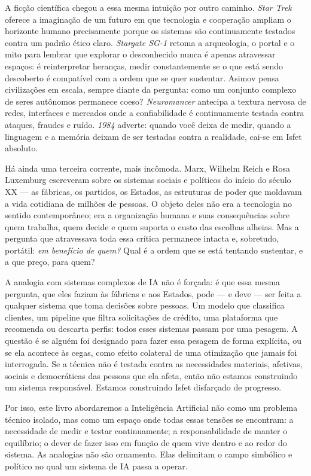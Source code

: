A ficção científica chegou a essa mesma intuição por outro caminho.
\textit{Star Trek} oferece a imaginação de um futuro em que tecnologia e
cooperação ampliam o horizonte humano precisamente porque os sistemas
são continuamente testados contra um padrão ético claro. \textit{Stargate
SG-1} retoma a arqueologia, o portal e o mito para lembrar que explorar
o desconhecido nunca é apenas atravessar espaços: é reinterpretar
heranças, medir constantemente se o que está sendo descoberto é
compatível com a ordem que se quer sustentar. Asimov pensa civilizações
em escala, sempre diante da pergunta: como um conjunto complexo de
seres autônomos permanece coeso? \textit{Neuromancer} antecipa a textura
nervosa de redes, interfaces e mercados onde a confiabilidade é
continuamente testada contra ataques, fraudes e ruído. \textit{1984}
adverte: quando você deixa de medir, quando a linguagem e a memória
deixam de ser testadas contra a realidade, cai-se em Isfet absoluto.

Há ainda uma terceira corrente, mais incômoda. Marx, Wilhelm Reich e
Rosa Luxemburg escreveram sobre os sistemas sociais e políticos do início
do século XX --- as fábricas, os partidos, os Estados, as estruturas de
poder que moldavam a vida cotidiana de milhões de pessoas. O objeto
deles não era a tecnologia no sentido contemporâneo; era a organização
humana e suas consequências sobre quem trabalha, quem decide e quem
suporta o custo das escolhas alheias. Mas a pergunta que atravessava toda
essa crítica permanece intacta e, sobretudo, portátil: \textit{em
benefício de quem?} Qual é a ordem que se está tentando sustentar, e a
que preço, para quem?

A analogia com sistemas complexos de IA não é forçada: é que essa mesma
pergunta, que eles faziam às fábricas e aos Estados, pode --- e deve ---
ser feita a qualquer sistema que toma decisões sobre pessoas. Um modelo
que classifica clientes, um pipeline que filtra solicitações de crédito,
uma plataforma que recomenda ou descarta perfis: todos esses sistemas
passam por uma pesagem. A questão é se alguém foi designado para
fazer essa pesagem de forma explícita, ou se ela acontece às cegas, como
efeito colateral de uma otimização que jamais foi interrogada. Se a
técnica não é testada contra as necessidades materiais, afetivas, sociais
e democráticas das pessoas que ela afeta, então não estamos construindo
um sistema responsável. Estamos construindo Isfet disfarçado de progresso.

Por isso, este livro abordaremos a Inteligência Artificial não como um
problema técnico isolado, mas como um espaço onde todas essas tensões se
encontram: a necessidade de medir e testar continuamente; a
responsabilidade de manter o equilíbrio; o dever de fazer isso em função
de quem vive dentro e ao redor do sistema. As analogias não são
ornamento. Elas delimitam o campo simbólico e político no qual um
sistema de IA passa a operar.

